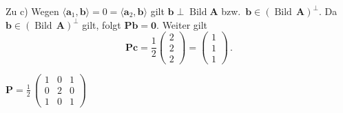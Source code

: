 {\medskip
{ Zu c)} Wegen $\langle\boldsymbol{a}_1,\boldsymbol{b}\rangle=0=\langle\boldsymbol{a}_2,
\boldsymbol{b}\rangle$ gilt $\boldsymbol{b}\perp\operatorname{Bild} \boldsymbol A$ bzw.\ $\boldsymbol{b}\in (\operatorname{Bild}\,\boldsymbol A)^{\perp}$. Da $\boldsymbol{b}\in (\operatorname{Bild}\,\boldsymbol A)^{\perp}$ gilt, folgt $\boldsymbol P \boldsymbol b = \boldsymbol 0$. Weiter gilt
$$
\boldsymbol P \boldsymbol c = \dfrac{1}{2}\begin{pmatrix} 2\\ 2\\ 2 \end{pmatrix} = \begin{pmatrix} 1\\ 1\\ 1 \end{pmatrix}\,.
$$
}

{
$\boldsymbol P=
\frac{1}{2}\,\left(\begin{array}{ccc}1&0&1\\0&2&0\\1&0&1\end{array}\right)$

}
